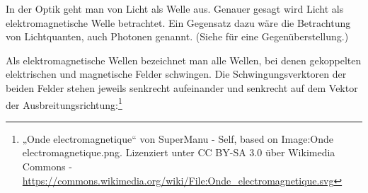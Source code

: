 




%
%	





In der Optik geht man von Licht als Welle aus. Genauer gesagt wird Licht als elektromagnetische Welle betrachtet. Ein Gegensatz dazu wäre die Betrachtung von Lichtquanten, auch Photonen genannt. (Siehe  für eine Gegenüberstellung.)

Als elektromagnetische Wellen bezeichnet man alle Wellen, bei denen gekoppelten elektrischen und magnetische Felder schwingen. Die Schwingungsverktoren der beiden Felder stehen jeweils senkrecht aufeinander und senkrecht auf dem Vektor der Ausbreitungsrichtung:\footnote{„Onde electromagnetique“ von SuperManu - Self, based on Image:Onde electromagnetique.png. Lizenziert unter CC BY-SA 3.0 über Wikimedia Commons - \url{https://commons.wikimedia.org/wiki/File:Onde_electromagnetique.svg}}

